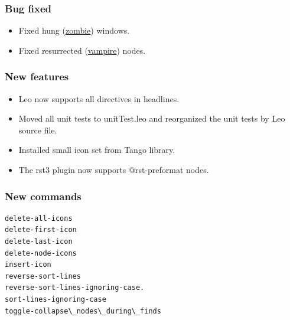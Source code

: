 \documentclass[a4paper,10pt,english]{sphinxmanual}
\begin{document}
\subsubsection{Bug fixed}
\label{what-is-new:bug-fixed}\begin{itemize}
\item {} 
Fixed hung (\href{http://sourceforge.net/forum/message.php?msg\_id=3768494}{zombie}) windows.

\item {} 
Fixed resurrected (\href{http://sourceforge.net/forum/message.php?msg\_id=3525277}{vampire}) nodes.

\end{itemize}


\subsubsection{New features}
\label{what-is-new:id14}\begin{itemize}
\item {} 
Leo now supports all directives in headlines.

\item {} 
Moved all unit tests to unitTest.leo and reorganized the unit tests by Leo source file.

\item {} 
Installed small icon set from Tango library.

\item {} 
The rst3 plugin now supports @rst-preformat nodes.

\end{itemize}


\subsubsection{New commands}
\label{what-is-new:id15}
\begin{Verbatim}[commandchars=\\\{\}]
delete-all-icons
delete-first-icon
delete-last-icon
delete-node-icons
insert-icon
reverse-sort-lines
reverse-sort-lines-ignoring-case.
sort-lines-ignoring-case
toggle-collapse\_nodes\_during\_finds
\end{Verbatim}
\end{document}
